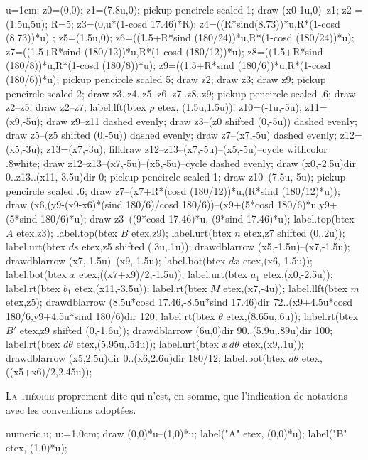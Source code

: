 \documentclass[12pt,a4paper,twocolumn]{book} %
\begin{document}
\begin{mpdisplay}
u=1cm;
z0=(0,0);
z1=(7.8u,0);
pickup pencircle scaled 1;
draw (x0-1u,0)--z1;
z2 = (1.5u,5u);
R=5;
z3=(0,u*(1-cosd 17.46)*R);
z4=((R*sind(8.73))*u,R*(1-cosd (8.73))*u) ;
z5=(1.5u,0);
z6=((1.5+R*sind (180/24))*u,R*(1-cosd (180/24))*u);
z7=((1.5+R*sind (180/12))*u,R*(1-cosd (180/12))*u);
z8=((1.5+R*sind (180/8))*u,R*(1-cosd (180/8))*u);
z9=((1.5+R*sind (180/6))*u,R*(1-cosd (180/6))*u);
pickup pencircle scaled 5;
draw z2;
draw z3;
draw z9;
pickup pencircle scaled 2;
draw z3..z4..z5..z6..z7..z8..z9;
pickup pencircle scaled .6;
draw z2--z5;
draw z2--z7;
label.lft(btex $\rho$ etex, (1.5u,1.5u));
z10=(-1u,-5u);
z11=(x9,-5u);
draw z9--z11 dashed evenly;
draw z3--(z0 shifted (0,-5u)) dashed evenly;
draw z5--(z5 shifted (0,-5u)) dashed evenly;
draw z7--(x7,-5u) dashed evenly;
z12=(x5,-3u);
z13=(x7,-3u);
filldraw z12--z13--(x7,-5u)--(x5,-5u)--cycle withcolor .8white;
draw z12--z13--(x7,-5u)--(x5,-5u)--cycle dashed evenly;
draw (x0,-2.5u){dir 0}..z13..(x11,-3.5u){dir 0};
pickup pencircle scaled 1;
draw z10--(7.5u,-5u);
pickup pencircle scaled .6;
draw z7--(x7+R*(cosd (180/12))*u,(R*sind (180/12)*u));
draw (x6,(y9-(x9-x6)*(sind 180/6)/cosd 180/6))--(x9+(5*cosd 180/6)*u,y9+(5*sind 180/6)*u);
draw z3--((9*cosd 17.46)*u,-(9*sind 17.46)*u);
label.top(btex $A$ etex,z3);
label.top(btex $B$ etex,z9);
label.urt(btex $n$ etex,z7 shifted (0,.2u));
label.urt(btex $ds$ etex,z5 shifted (.3u,.1u));
drawdblarrow (x5,-1.5u)--(x7,-1.5u);
drawdblarrow (x7,-1.5u)--(x9,-1.5u);
label.bot(btex $dx$ etex,(x6,-1.5u));
label.bot(btex $x$ etex,((x7+x9)/2,-1.5u));
label.urt(btex $a_1$ etex,(x0,-2.5u));
label.rt(btex $b_1$ etex,(x11,-3.5u));
label.rt(btex $M$ etex,(x7,-4u));
label.llft(btex $m$ etex,z5);
drawdblarrow (8.5u*cosd 17.46,-8.5u*sind 17.46){dir 72}..(x9+4.5u*cosd 180/6,y9+4.5u*sind 180/6){dir 120};
label.rt(btex $\theta$ etex,(8.65u,.6u));
label.rt(btex $B'$ etex,z9 shifted (0,-1.6u));
drawdblarrow (6u,0){dir 90}..(5.9u,.89u){dir 100};
label.rt(btex $d\theta$ etex,(5.95u,.54u));
label.urt(btex $x\,d\theta$ etex,(x9,.1u));
drawdblarrow (x5,2.5u){dir 0}..(x6,2.6u){dir 180/12};
label.bot(btex $d\theta$ etex,((x5+x6)/2,2.45u));
\end{mpdisplay}



\lettrine{L}{a théorie} proprement dite qui n'est, en somme, que l'indication
de notations avec les conventions adoptées.
\begin{mpdisplay}
    numeric u; u:=1.0cm;
    draw (0,0)*u--(1,0)*u;
    label(\btex "A" etex, (0,0)*u);
    label(\btex "B" etex, (1,0)*u);
\end{mpdisplay}
\end{document}
